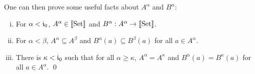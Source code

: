 \documentclass{article}
\begin{document}
One can then prove some useful facts about $A^{\alpha}$ and
  $B^{\alpha}$: %
\begin{lemma} \mbox{}
\label{thm:A-in-Set}
  \begin{enumerate}[(i)]
  \item For $\alpha < \mathfrak{i}_0$, $A^{\alpha} \in \llbracket \text{Set} \rrbracket$ and $B^{\alpha} :
    A^{\alpha} \to \llbracket \text{Set} \rrbracket$. 
  \item For $\alpha < \beta$, $A^{\alpha} \subseteq A^{\beta}$ and  $B^{\alpha}(a) \subseteq
    B^{\beta}(a)$ for all $a \in A^{\alpha}$. 
  \item There is $\kappa < \mathfrak{i}_0$ such that for  all $\alpha \geq \kappa$,
    $A^{\alpha} = A^{\kappa}$ and $B^{\alpha}(a) =  B^{\kappa}(a)$ for all $a
    \in A^{\alpha}$. \qed 
  \end{enumerate}
\end{lemma}
\end{document}
